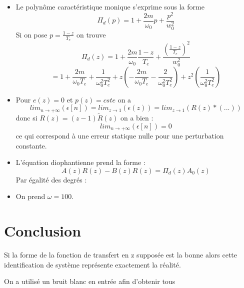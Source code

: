 \documentclass[../../Cours_M1.tex]{subfiles}
\begin{document}
\begin{itemize}

\item Le polynôme caractéristique monique s'exprime sous la forme \[\Pi_d(p) = 1+\frac{2m}{\omega_0}p + \frac{p^2}{w_0^2}
\]
Si on pose $p=\frac{1-z}{T_e}$ on trouve \[\Pi_d(z) = 1+\frac{2m}{\omega_0}\frac{1-z}{T_e} + \frac{(\frac{1-z}{T_e})^2}{w_0^2}\]
\[=1+\frac{2m}{\omega_0T_e}+\frac{1}{\omega_0^2T_e^2} + z(-\frac{2m}{ \omega_0T_e} - \frac{2}{\omega_0^2T_e^2}) + z^2(\frac{1}{\omega_0^2T_e^2})\]

\item Pour $e(z) = 0$ et $p(z) = cste$ on a \[lim_{n\rightarrow+\infty}(\epsilon[n]) = lim_{z\rightarrow1}(\epsilon(z)) = lim_{z\rightarrow1}(R(z)*(...))\]
donc si $R(z) = (z-1)\tilde{R}(z)$ on a bien : \[lim_{n\rightarrow+\infty}(\epsilon[n]) = 0\] ce qui correspond à une erreur statique nulle pour une perturbation constante.

\item L'équation diophantienne prend la forme : \[A(z)R(z) - B(z)R(z) = \Pi_d(z)A_0(z) \]
Par égalité des degrés : 

\item On prend $\omega = 100$.

\end{itemize}

\section*{Conclusion}

Si la forme de la fonction de transfert en z supposée est la bonne alors cette identification de système représente exactement la réalité.

On a utilisé un bruit blanc en entrée afin d'obtenir tous
\end{document}
